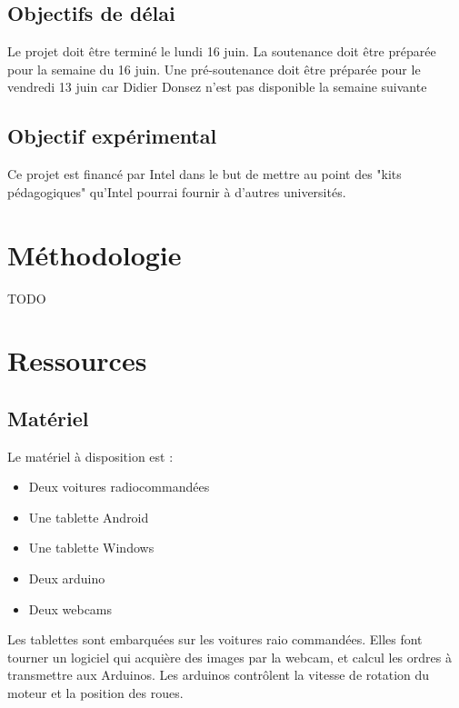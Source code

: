 \documentclass[a4paper,12pt]{article}
\begin{document}
\subsection{Objectifs de délai}

Le projet doit être terminé le lundi 16 juin.
La soutenance doit être préparée pour la semaine du 16 juin.
Une pré-soutenance doit être préparée pour le vendredi 13 juin car Didier
Donsez n'est pas disponible la semaine suivante

\subsection{Objectif expérimental}

Ce projet est financé par Intel dans le but de mettre au point des "kits
pédagogiques" qu'Intel pourrai fournir à d'autres universités.











\section{Méthodologie}
TODO









\section{Ressources}

\subsection{Matériel}

Le matériel à disposition est :
\begin{itemize}
    \item Deux voitures radiocommandées
    \item Une tablette Android
    \item Une tablette Windows
    \item Deux arduino
    \item Deux webcams
\end{itemize}

Les tablettes sont embarquées sur les voitures raio commandées. Elles font
tourner un logiciel qui acquière des images par la webcam, et calcul les ordres
à transmettre aux Arduinos. Les arduinos contrôlent la vitesse de rotation du
moteur et la position des roues.
\end{document}
